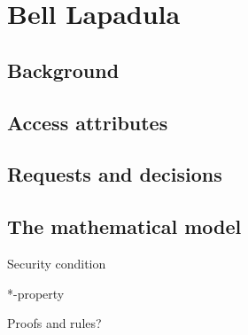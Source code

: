 \section{Bell Lapadula}

\subsection{Background}

\subsection{Access attributes}

\subsection{Requests and decisions}

\subsection{The mathematical model}

Security condition

*-property

Proofs and rules?

